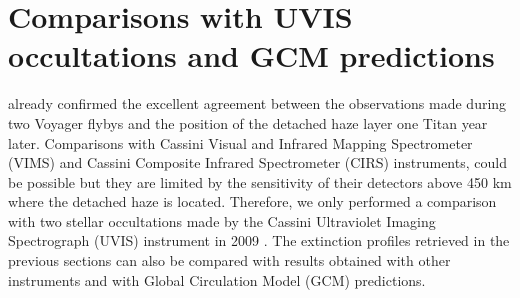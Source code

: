 \section{Comparisons with UVIS occultations and GCM predictions}

\cite{West2018} already confirmed the excellent agreement between the observations made during
two Voyager flybys and the position of the detached haze layer one Titan year later.
Comparisons with Cassini Visual and Infrared Mapping Spectrometer (VIMS) and
Cassini Composite Infrared Spectrometer (CIRS) instruments, could be possible but
they are limited by the sensitivity of their detectors above 450 km where the detached haze is located.
Therefore, we only performed a comparison with two stellar occultations
made by the Cassini Ultraviolet Imaging Spectrograph (UVIS) instrument in 2009 \citep{Koskinen2011}.
The extinction profiles retrieved in the previous sections can also be compared with results
obtained with other instruments and with Global Circulation Model (GCM) predictions.


